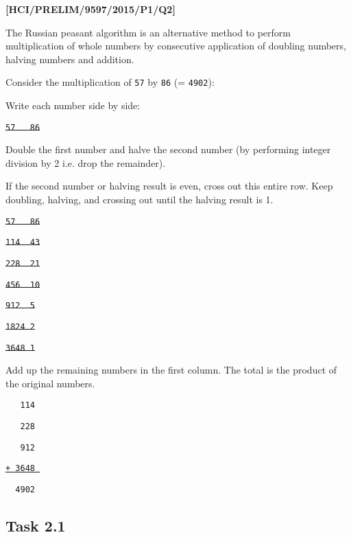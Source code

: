 \item \textbf{{[}HCI/PRELIM/9597/2015/P1/Q2{]} }

The Russian peasant algorithm is an alternative method to perform
multiplication of whole numbers by consecutive application of doubling
numbers, halving numbers and addition. 

Consider the multiplication of \texttt{57} by \texttt{86} (= \texttt{4902}): 

Write each number side by side: 
\noindent \begin{center}
\texttt{\sout{57 ~~86}}
\par\end{center}

Double the first number and halve the second number (by performing
integer division by 2 i.e. drop the remainder).

If the second number or halving result is even, cross out this entire
row. Keep doubling, halving, and crossing out until the halving result
is 1.
\noindent \begin{center}
\noindent\begin{minipage}[t]{1\columnwidth}%
\texttt{\sout{57 ~~86}}

\texttt{\sout{114 ~43}}\texttt{ }

\texttt{\sout{228 ~21}}

\texttt{\sout{456 ~10}}

\texttt{\sout{912 ~5 }}

\texttt{\sout{1824 2 }}

\texttt{\sout{3648 1}}\texttt{ }%
\end{minipage}
\par\end{center}

Add up the remaining numbers in the first column. The total is the
product of the original numbers. 
\noindent \begin{center}
\noindent\begin{minipage}[t]{1\columnwidth}%
\texttt{~~~114}

\texttt{~~~228}

\texttt{~~~912}

\texttt{\uline{+ 3648 }}

\texttt{~~4902}%
\end{minipage}
\par\end{center}


\subsection*{Task 2.1 }

